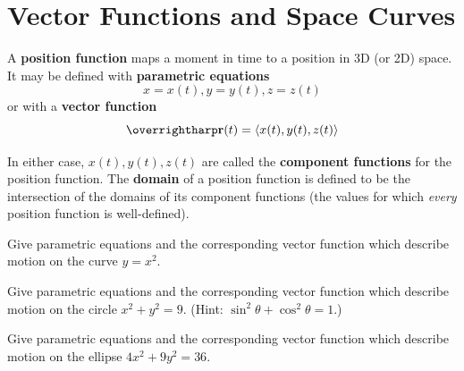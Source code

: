 \documentclass[letterpaper, twoside, 12pt]{book}
\begin{document}

\setcounter{chapter}{13}
\setcounter{section}{0}

\section{Vector Functions and Space Curves}

\begin{definition}
A \textbf{position function} maps a moment in time to a position in 3D
(or 2D) space.
It may be defined with \textbf{parametric equations}
  \[x=x(t), y=y(t), z=z(t)\]
or with a \textbf{vector function}
\[\vect{r}(t) = \<x(t),y(t),z(t)\>\]

In either case, $x(t),y(t),z(t)$ are called the \textbf{component functions}
for the position function. The \textbf{domain} of a position function is
defined to be the intersection of the domains of its component functions
(the values for which \textit{every} position function is well-defined).
\end{definition}

          \begin{problem}
            Give parametric equations and the corresponding vector function
            which describe motion on the curve $y=x^2$.
          \end{problem}

          \begin{solution}

          \end{solution}

          \begin{problem}
            Give parametric equations and the corresponding vector function
            which describe motion on the circle $x^2+y^2=9$.
            (Hint: $\sin^2 \theta + \cos^2 \theta = 1$.)
          \end{problem}

          \begin{solution}

          \end{solution}

          \begin{problem}
            Give parametric equations and the corresponding vector function
            which describe motion on the ellipse $4x^2+9y^2=36$.
          \end{problem}

          \begin{solution}

          \end{solution}
\end{document}
